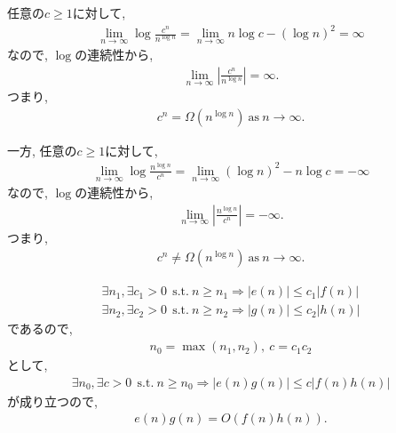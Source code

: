 \begin{ex}
    \label{ex3.13}
    任意の$c \geq 1$に対して,
    \begin{align*}
        \lim_{n \to \infty} \log \frac{c^n}{n^{\log n}} =  \lim_{n \to \infty}  n \log c - (\log n)^2  = \infty
    \end{align*}
    なので, $\log$の連続性から,
    \begin{align*}
        \lim_{n \to \infty}  \left|\frac{c^n}{n^{\log n}}\right| = \infty.
    \end{align*}
    つまり,
    \begin{align*}
        c^n = \Omega (n^{\log n}) \mathrm{\ as\ } n \to \infty.
    \end{align*}
    \par
    一方,
    任意の$c \geq 1$に対して,
    \begin{align*}
        \lim_{n \to \infty} \log \frac{n^{\log n}}{c^n} =  \lim_{n \to \infty} (\log n)^2 -  n \log c = -\infty
    \end{align*}
    なので, $\log$の連続性から,
    \begin{align*}
        \lim_{n \to \infty}  \left|\frac{n^{\log n}}{c^n}\right| = -\infty.
    \end{align*}
    つまり,
    \begin{align*}
        c^n \neq \Omega (n^{\log n}) \mathrm{\ as\ } n \to \infty.
    \end{align*}
\end{ex}

\begin{ex}
    \label{ex3.14}
    \begin{align*}
        \exists{n_1} ,\exists{c_1>0} \ \mathrm{\ s.t.\ }
        n \geq n_1 \Rightarrow |e(n)| \leq c_1 |f(n)| \\
        \exists{n_2} ,\exists{c_2>0} \ \mathrm{\ s.t.\ }
        n \geq n_2 \Rightarrow |g(n)| \leq c_2 |h(n)|
    \end{align*}
    であるので,
    \begin{align*}
        n_0 = \max(n_1,n_2), \ c = c_1 c_2
    \end{align*}
    として,
    \begin{align*}
        \exists{n_0} ,\exists{c>0} \ \mathrm{\ s.t.\ }
        n \geq n_0 \Rightarrow |e(n)g(n)| \leq c |f(n)h(n)|
    \end{align*}
    が成り立つので,
    \begin{align*}
        e(n) g(n) = O\left(f(n)h(n)\right).
    \end{align*}
\end{ex}

